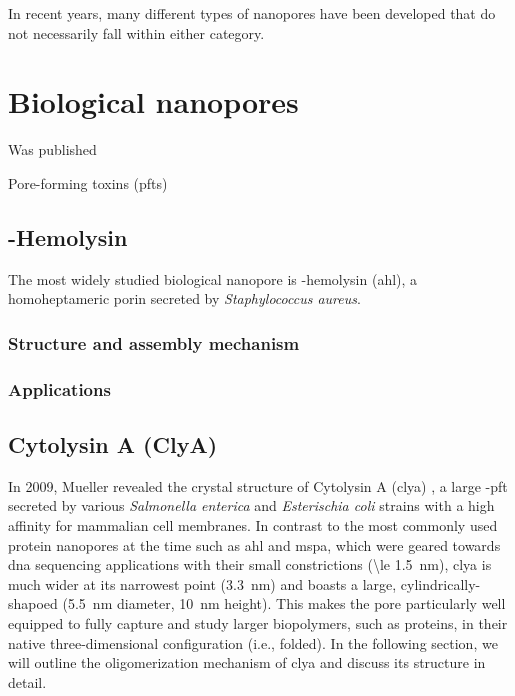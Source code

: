 In recent years, many different types of nanopores have been developed that do not necessarily fall within either category. 





\section{Biological nanopores}


Was published \cite{Willems-VanMeervelt-2017}

Pore-forming toxins (\glspl{pft})

\subsection{\textalpha-Hemolysin}

The most widely studied biological nanopore is \textalpha-hemolysin (\gls{ahl}), a homoheptameric porin
secreted by \textit{Staphylococcus aureus}.

\subsubsection{Structure and assembly mechanism}

\subsubsection{Applications}




\subsection{Cytolysin A (ClyA)}

In 2009, Mueller \etal{} revealed the crystal structure of Cytolysin A (\gls{clya}) \cite{Mueller-2009}, a
large \textalpha-\gls{pft} secreted by various \textit{Salmonella enterica} and \textit{Esterischia coli}
strains with a high affinity for mammalian cell membranes. In contrast to the most commonly used protein
nanopores at the time such as \gls{ahl} and \gls{mspa}, which were geared towards \gls{dna} sequencing
applications with their small constrictions (\SI{\le 1.5}{\nm}), \gls{clya} is much wider at its narrowest
point (\SI{3.3}{\nm}) and boasts a large, cylindrically-shapoed \lumen{} (\SI{5.5}{\nm} diameter, \SI{10}{\nm}
height). This makes the pore particularly well equipped to fully capture and study larger biopolymers, such as
proteins, in their native three-dimensional configuration (i.e., folded). In the following section, we will
outline the oligomerization mechanism of \gls{clya} and discuss its structure in detail.

